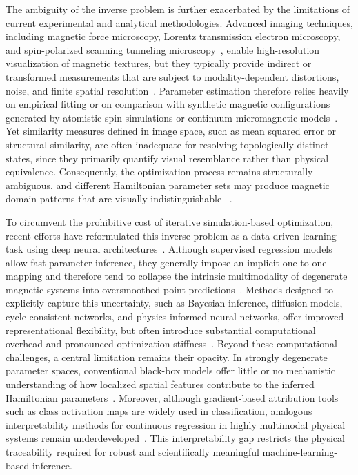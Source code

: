 \documentclass[final,5p,times,twocolumn]{elsarticle}
\begin{document}
The ambiguity of the inverse problem is further exacerbated by the limitations of current experimental and analytical methodologies. Advanced imaging techniques, including magnetic force microscopy, Lorentz transmission electron microscopy, and spin-polarized scanning tunneling microscopy~\cite{nguyen2022cooperative}, enable high-resolution visualization of magnetic textures, but they typically provide indirect or transformed measurements that are subject to modality-dependent distortions, noise, and finite spatial resolution~\cite{zhao2025overview}. Parameter estimation therefore relies heavily on empirical fitting or on comparison with synthetic magnetic configurations generated by atomistic spin simulations or continuum micromagnetic models~\cite{d2023micromagnetic}. Yet similarity measures defined in image space, such as mean squared error or structural similarity, are often inadequate for resolving topologically distinct states, since they primarily quantify visual resemblance rather than physical equivalence. Consequently, the optimization process remains structurally ambiguous, and different Hamiltonian parameter sets may produce magnetic domain patterns that are visually indistinguishable ~\cite{karnatov2025analysis}.

To circumvent the prohibitive cost of iterative simulation-based optimization, recent efforts have reformulated this inverse problem as a data-driven learning task using deep neural architectures~\cite{lee2024deep}. Although supervised regression models allow fast parameter inference, they generally impose an implicit one-to-one mapping and therefore tend to collapse the intrinsic multimodality of degenerate magnetic systems into oversmoothed point predictions~\cite{chen2024data}. Methods designed to explicitly capture this uncertainty, such as Bayesian inference, diffusion models, cycle-consistent networks, and physics-informed neural networks, offer improved representational flexibility, but often introduce substantial computational overhead and pronounced optimization stiffness~\cite{huang2023cycle, baldan2023physics}. Beyond these computational challenges, a central limitation remains their opacity. In strongly degenerate parameter spaces, conventional black-box models offer little or no mechanistic understanding of how localized spatial features contribute to the inferred Hamiltonian parameters~\cite{wang2021learning, vcadevz2026neural}. Moreover, although gradient-based attribution tools such as class activation maps are widely used in classification, analogous interpretability methods for continuous regression in highly multimodal physical systems remain underdeveloped~\cite{he2022survey}. This interpretability gap restricts the physical traceability required for robust and scientifically meaningful machine-learning-based inference.
\end{document}
